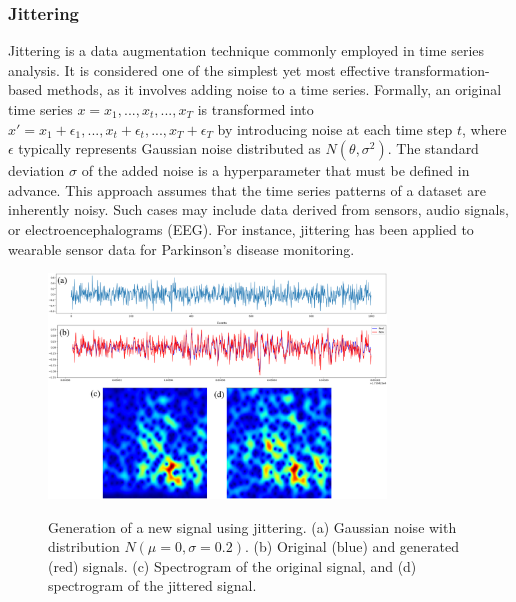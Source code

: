 \documentclass[journal]{IEEEtran}
\begin{document}
\subsubsection{Jittering}
Jittering is a data augmentation technique commonly employed in time series analysis\cite{iwana2021empirical,iglesias2023data}. It is considered one of the simplest yet most effective transformation-based methods, as it involves adding noise to a time series.
Formally, an original time series $x={x_1,...,x_t,...,x_T}$ is transformed into $x'={x_1+\epsilon_1,...,x_t+\epsilon_t,...,x_T+\epsilon_T}$ by introducing noise at each time step $t$, where $\epsilon$ typically represents Gaussian noise distributed as $N(\theta,\sigma^2)$. The standard deviation $\sigma$ of the added noise is a hyperparameter that must be defined in advance\cite{iwana2021empirical}.
This approach assumes that the time series patterns of a dataset are inherently noisy. Such cases may include data derived from sensors, audio signals, or electroencephalograms (EEG). For instance, jittering has been applied to wearable sensor data for Parkinson’s disease monitoring.
\begin{figure}
\centering
{\includegraphics[width=0.8\textwidth,keepaspectratio]{img/da_jittering.png}}
\caption{Generation of a new signal using jittering. (a) Gaussian noise with distribution $N(\mu=0,\sigma=0.2)$. (b) Original (blue) and generated (red) signals. (c) Spectrogram of the original signal, and (d) spectrogram of the jittered signal.}
\label{fig:da_jittering}
\end{figure}
\end{document}
